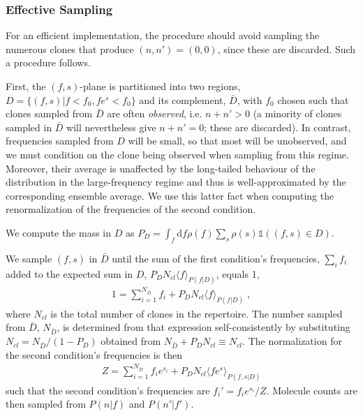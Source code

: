 \documentclass[letterpaper,english,prl,reprint,longbibliography]{revtex4-1} %
\begin{document}
\subsubsection*{Effective Sampling}
For an efficient implementation, the procedure should avoid sampling the numerous clones that produce $(n,n')=(0,0)$, since these are discarded. Such a procedure follows. 

First, the $(f,s)$-plane is partitioned into two regions, $D=\{(f,s)|f<f_0,fe^s<f_0\}$ and its complement, $\bar D$, with $f_0$ chosen such that clones sampled from $\bar D$ are often \textit{observed}, i.e. $n+n'>0$ (a minority of clones sampled in $\bar D$ will nevertheless give $n+n'=0$; these are discarded). In contrast, frequencies sampled from $D$ will be small, so that most will be unobserved, and we must condition on the clone being observed when sampling from this regime. Moreover, their average is unaffected by the long-tailed behaviour of the distribution in the large-frequency regime and thus is well-approximated by the corresponding ensemble average. We use this latter fact when computing the renormalization of the frequencies of the second condition. 

We compute the mass in $D$ as $P_D=\int_f \textrm{d}f\rho(f)\sum_s \rho(s) \mathbb{1}((f,s)\in D)$.

We sample $(f,s)$ in $\bar D$ until the sum of the first condition's frequencies, $\sum_i f_i$ added to the expected sum in $D$, $P_D N_{cl}\langle f\rangle_{P(f|D)}$, equals 1,
\begin{align}
	1=\sum_{i=1}^{N_{\bar D}} f_i + P_D N_{cl}\langle f\rangle_{P(f|D)}\;,
\end{align}
where $N_{cl}$ is the total number of clones in the repertoire. The number sampled from $\bar D$, $N_{\bar D}$, is determined from that expression self-consistently by substituting $N_{cl}=N_{\bar D}/(1-P_D)$ obtained from $N_{\bar D}+P_D N_{cl}\equiv N_{cl}$. The normalization for the second condition's frequencies is then 
\begin{align}
	Z=\sum_{i=1}^{N_{\bar D}} f_ie^{s_i} + P_D N_{cl}\langle fe^s\rangle_{P(f,s|D)}
\end{align}
such that the second condition's frequencies are ${f_i'=f_ie^{s_i}/Z}$. Molecule counts are then sampled from $P(n|f)$ and $P(n'|f')$.  
\end{document}
